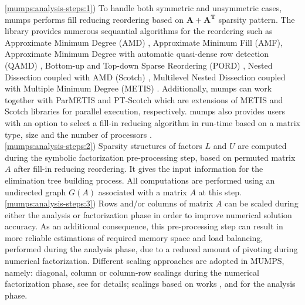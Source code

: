 \ref{mumps:analysis-steps:1}) To handle both symmetric and unsymmetric cases, \acrshort{mumps} performs fill reducing reordering based on $\boldsymbol{A} + \boldsymbol{A^T}$ sparsity pattern. The library provides numerous sequantial algorithms for the reordering such as Approximate Minimum Degree (AMD) \cite{reordering:AMD}, Approximate Minimum Fill (AMF), Approximate Minimum Degree with automatic quasi-dense row detection (QAMD) \cite{reordering:QAMD}, Bottom-up and Top-down Sparse Reordering (PORD) \cite{reordering:PORD}, Nested Dissection coupled with AMD (Scotch) \cite{reordering:SCOTCH}, Multilevel Nested Dissection coupled with Multiple Minimum Degree (METIS) \cite{reordering:METIS}. Additionally, \acrshort{mumps} can work together with ParMETIS and PT-Scotch which are extensions of METIS and Scotch libraries for parallel execution, respectively. \acrshort{mumps} also provides users with an option to select a fill-in reducing algorithm in run-time based on a matrix type, size and the number of processors \cite{mumps-manual}.\\


\ref{mumps:analysis-steps:2}) Sparsity structures of factors $L$ and $U$ are computed during the symbolic factorization pre-processing step, based on permuted matrix $A$ after fill-in reducing reordering. It gives the input information for the elimination tree building process.  All computations are performed using an undirected graph $G(A)$ associated with a matrix $A$ at this step.\\




\ref{mumps:analysis-steps:3}) Rows and/or columns of matrix $A$ can be scaled during either the analysis or factorization phase in order to improve numerical solution accuracy. As an additional consequence, this pre-processing step can result in more reliable estimations of required memory space and load balancing, performed during the analysis phase, due to a reduced amount of pivoting during numerical factorization. Different scaling approaches are adopted in MUMPS, namely: diagonal, column or column-row scalings during the numerical factorization phase, see \cite{mumps-manual} for details; scalings based on works \cite{mm:scaling:duff1999design}, \cite{mm:scaling:duff2001algorithms} and \cite{mm:scaling:duff2005strategies} for the analysis phase.\\


